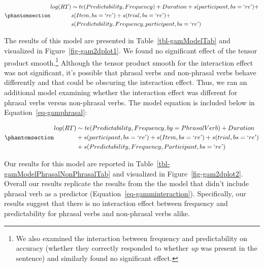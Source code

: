 \documentclass[
  12pt,
  letterpaper,
]{scrreprt}
\begin{document}
\begin{equation}\phantomsection\label{eq-gamminteraction}{
\begin{aligned}log(RT) & \sim te(Predictability, Frequency) + Duration + s(participant, bs = \text{`}re\text{'}) + \\ & s(Item, bs = \text{`}re\text{'}) + s(trial, bs = \text{`}re\text{'}) + \\ & s(Predictability, Frequency, participant, bs = \text{`}re\text{'}) \end{aligned}
}\end{equation}

The results of this model are presented in Table~\ref{tbl-gamModelTab}
and visualized in Figure~\ref{fig-gam2dplot1}. We found no significant
effect of the tensor product smooth.\footnote{We also examined the
  interaction between frequency and predictability on accuracy (whether
  they correctly responded to whether \emph{up} was present in the
  sentence) and similarly found no significant effect.} Although the
tensor product smooth for the interaction effect was not significant,
it's possible that phrasal verbs and non-phrasal verbs behave
differently and that could be obscuring the interaction effect. Thus, we
ran an additional model examining whether the interaction effect was
different for phrasal verbs versus non-phrasal verbs. The model equation
is included below in Equation~\ref{eq-gamphrasal}:

\begin{equation}\phantomsection\label{eq-gamphrasal}{
\begin{aligned}log(RT) & \sim te(Predictability, Frequency, by = PhrasalVerb) + Duration \\ & + s(participant, bs = \text{`}re\text{'}) + s(Item, bs = \text{`}re\text{'})  + s(trial, bs = \text{`}re\text{'}) \\ & + s(Predictability, Frequency, Participant, bs = \text{`}re\text{'}) \end{aligned}
}\end{equation}

Our results for this model are reported in
Table~\ref{tbl-gamModelPhrasalNonPhrasalTab} and visualized in
Figure~\ref{fig-gam2dplot2}. Overall our results replicate the results
from the the model that didn't include phrasal verb as a predictor
(Equation~\ref{eq-gamminteraction}). Specifically, our results suggest
that there is no interaction effect between frequency and predictability
for phrasal verbs and non-phrasal verbs alike.
\end{document}
